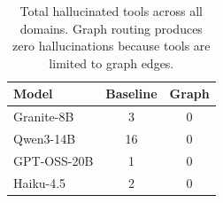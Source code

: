 \begin{table}[t]
\centering
\small
\begin{tabular}{l cc}
\toprule
\textbf{Model} & \textbf{Baseline} & \textbf{Graph} \\
\midrule
Granite-8B & 3 & 0 \\
Qwen3-14B & 16 & 0 \\
GPT-OSS-20B & 1 & 0 \\
Haiku-4.5 & 2 & 0 \\
\bottomrule
\end{tabular}
\caption{Total hallucinated tools across all domains. Graph routing produces zero hallucinations because tools are limited to graph edges.}
\label{tab:hallucinations}
\end{table}